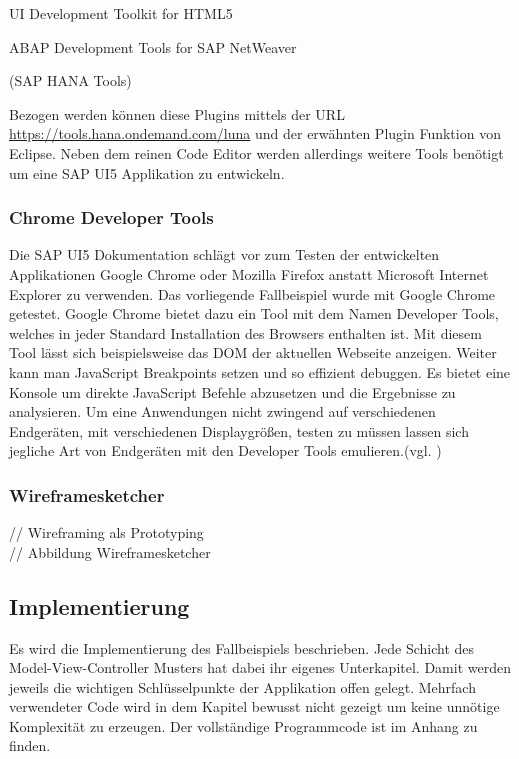 	\vspace{1em}
    \begin{compactitem}
	    \item UI Development Toolkit for HTML5
	    \item ABAP Development Tools for SAP NetWeaver
	    \item (SAP HANA Tools)	    
    \end{compactitem}
	\vspace{1em}

Bezogen werden können diese Plugins mittels der URL \url{https://tools.hana.ondemand.com/luna} und der erwähnten Plugin Funktion von Eclipse. Neben dem reinen Code Editor werden allerdings weitere Tools benötigt um eine SAP UI5 Applikation zu entwickeln.

\subsubsection{Chrome Developer Tools}
Die SAP UI5 Dokumentation schlägt vor zum Testen der entwickelten Applikationen Google Chrome oder Mozilla Firefox anstatt Microsoft Internet Explorer zu verwenden. Das vorliegende Fallbeispiel wurde mit Google Chrome getestet. Google Chrome bietet dazu ein Tool mit dem Namen Developer Tools, welches in jeder Standard Installation des Browsers enthalten ist. Mit diesem Tool lässt sich beispielsweise das DOM der aktuellen Webseite anzeigen. Weiter kann man JavaScript Breakpoints setzen und so effizient debuggen. Es bietet eine Konsole um direkte JavaScript Befehle abzusetzen und die Ergebnisse zu analysieren. Um eine Anwendungen nicht zwingend auf verschiedenen Endgeräten, mit verschiedenen Displaygrößen, testen zu müssen lassen sich jegliche Art von Endgeräten mit den Developer Tools emulieren.(vgl. \cite{DevTools})


\subsubsection{Wireframesketcher}
// Wireframing als Prototyping\\
// Abbildung Wireframesketcher\\

\subsection{Implementierung}
Es wird die Implementierung des Fallbeispiels beschrieben. Jede Schicht des Model-View-Controller Musters hat dabei ihr eigenes Unterkapitel. Damit werden jeweils die wichtigen Schlüsselpunkte der Applikation offen gelegt. Mehrfach verwendeter Code wird in dem Kapitel bewusst nicht gezeigt um keine unnötige Komplexität zu erzeugen. Der vollständige Programmcode ist im Anhang zu finden.

